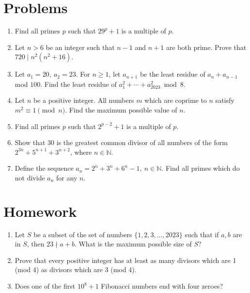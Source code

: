 \documentclass{article}
\begin{document}
\section{Problems}
\begin{enumerate}
	\item Find all primes $p$ such that $29^p+1$ is a multiple of $p$.
	\item Let $n>6$ be an integer such that $n-1$ and $n+1$ are both prime. Prove
	      that $720\mid n^2(n^2+16)$.
	\item Let $a_1=20,\ a_2=23$. For $n\ge 1$, let $a_{n+1}$ be the least residue
	      of $a_n+a_{n-1}$ mod $100$. Find the least residue of
	      $a_1^2+\cdots+a_{2023}^2\bmod 8$.
	\item Let $n$ be a positive integer. All numbers $m$ which are coprime to $n$
	      satisfy $m^2\equiv 1\pmod n$. Find the maximum possible value of $n$.
	\item Find all primes $p$ such that $2^{p-2}+1$ is a multiple of $p$.
	\item Show that $30$ is the greatest common divisor of all numbers of the form
	      $2^{3n}+5^{n+1}+3^{n+2}$, where $n \in \mathbb{N}$.
	\item Define the sequence $a_n=2^n+3^n+6^n-1,\ n\in\mathbb N$.
	      Find all primes which do not divide $a_n$ for any $n$.
\end{enumerate}
\newpage
\section{Homework}
\begin{enumerate}
	\item Let $S$ be a subset of the set of numbers $\{1, 2, 3,\ldots, 2023\}$
	      such that if $a,b$ are in $S$, then $23\nmid a+b$. What is the maximum
	      possible size of $S$?
	\item Prove that every positive integer has at least as many divisors which
	      are 1 (mod 4) as divisors which are 3 (mod 4).
	\item Does one of the first $10^8+1$ Fibonacci numbers end with four zeroes?
\end{enumerate}
\end{document}
